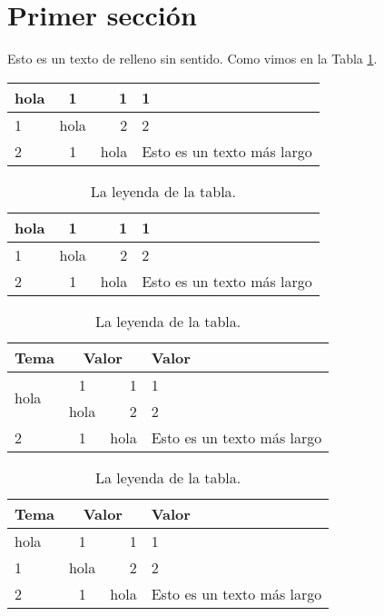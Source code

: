 \documentclass[12pt]{article}
\begin{document}
\section{Primer sección}
Esto es un texto de relleno sin sentido. Como vimos en la Tabla \ref{tab:datos}.

\begin{tabular}{|l|c|r|p{3cm}|}
	\hline
	hola & 1 & 1 & 1 \\
	\hline
	1 & hola & 2 & 2 \\
	\hline
	2 & 1 & hola & Esto es un texto más largo \\
	\hline
\end{tabular}

\begin{table}[h]
	\centering
	\caption{La leyenda de la tabla.}
	\begin{tabular}{|l|c|r|p{3cm}|}
		\hline
		hola & 1 & 1 & 1 \\
		\hline
		1 & hola & 2 & 2 \\
		\hline
		2 & 1 & hola & Esto es un texto más largo \\
		\hline
	\end{tabular}
	\label{tab:datos}
\end{table}

\begin{table}[h]
	\centering
	\caption{La leyenda de la tabla.}
	\begin{tabular}{|l|c|r|p{3cm}|}
		\hline
		\textbf{Tema} & \multicolumn{2}{|c|}{\textbf{Valor}} & \textbf{Valor} \\
		\hline
		\multirow[c]{2}{*}{hola} & 1 & 1 & 1 \\
		\cline{2-4}
		 & hola & 2 & 2 \\
		\hline
		2 & 1 & hola & Esto es un texto más largo \\
		\hline
	\end{tabular}
	\label{tab:datos2}
\end{table}

\begin{table}[h]
	\centering
	\caption{La leyenda de la tabla.}
	\begin{tabular}{lcrp{3cm}}
		\toprule
		\textbf{Tema} & \multicolumn{2}{c}{\textbf{Valor}} & \textbf{Valor} \\
		\midrule
		\cellcolor{gris}hola & 1 & 1 & 1 \\
		1 & hola & 2 & 2 \\
		2 & 1 & hola & Esto es un texto más largo \\
		\bottomrule
	\end{tabular}
	\label{tab:datos3}
\end{table}
\end{document}
